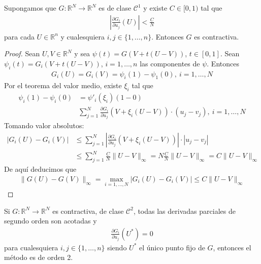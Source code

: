 \begin{teo}
Supongamos que $G: \mathbb{R}^N \longrightarrow \mathbb{R}^N$ es de clase $\mathscr{C}^1$ y existe $C \in [0,1)$ tal que
\begin{align*}
    \left| \frac{\partial G_i}{\partial u_j}(U) \right| < \frac{C}{N}
\end{align*}
para cada $U \in \mathbb{R}^n$ y cualesquiera $i,j \in \{1,\ldots,n\}$. Entonces $G$ es contractiva.
\end{teo}

\begin{proof}
Sean $U,V \in \mathbb{R}^N$ y sea $\psi(t) = G(V +t(U-V))$, $t \in [0,1]$. Sean $\psi_i(t) = G_i(V +t(U-V))$, $i = 1,\ldots,n$ las componentes de $\psi$. Entonces
\begin{align*}
    G_i(U) = G_i(V) = \psi_i(1) - \psi_1(0), \ i = 1,\ldots,N
\end{align*}
Por el teorema del valor medio, existe $\xi_i$ tal que
\begin{align*}
    \psi_i(1) - \psi_i(0) &= \psi'_i(\xi_i)(1-0) \\
    & \sum_{j=1}^{N} \frac{\partial G_i}{ \partial u_j}(V + \xi_i(U-V)) \cdot (u_j - v_j), \ i = 1,\ldots,N
\end{align*}
Tomando valor absolutos:
\begin{align*}
    |G_i(U) - G_i(V)| &\leq \sum_{j=1}^{N} \left| \frac{\partial G_i}{ \partial u_j}(V + \xi_i(U-V)) \right| \cdot |u_j - v_j| \\
    & \leq \sum_{j=1}^{N} \frac{C}{N} \|U - V\|_{\infty} = N \frac{C}{N} \|U-V\|_{\infty} = C\|U-V\|_{\infty}
\end{align*}
De aquí deducimos que
\begin{align*}
    \|G(U) - G(V)\|_{\infty} = \max_{i = 1,\ldots,N} |G_i(U) - G_i(V)| \leq C \|U-V\|_{\infty}
\end{align*}
\end{proof}

\begin{prop}
Si $G: \mathbb{R}^N \longrightarrow \mathbb{R}^N$ es contractiva, de clase $\mathscr{C}^2$, todas las derivadas parciales de segundo orden son acotadas y 
\begin{align*}
    \frac{\partial G_i}{\partial u_j}(U^*) = 0 
\end{align*}
para cualesquiera $i,j \in \{1,\ldots,n\}$ siendo $U^*$ el único punto fijo de $G$, entonces el método es de orden 2.
\end{prop}

